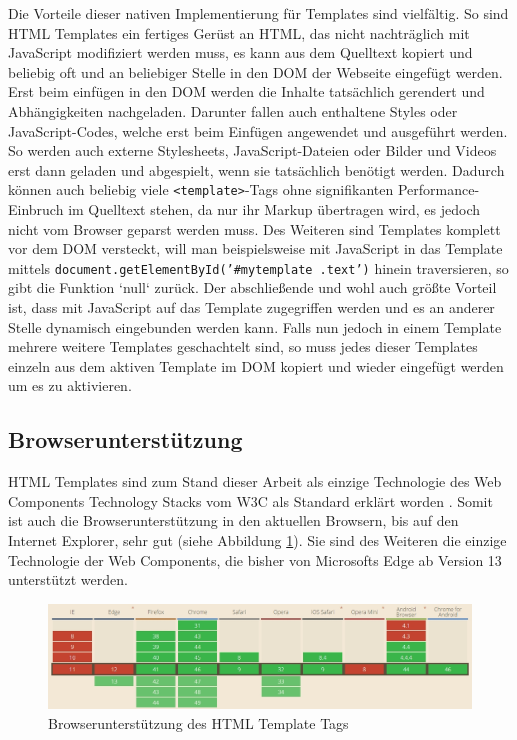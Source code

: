Die Vorteile dieser nativen Implementierung für Templates sind vielfältig. So sind \ac{HTML} Templates ein fertiges Gerüst an \ac{HTML}, das nicht nachträglich mit JavaScript modifiziert werden muss, es kann aus dem Quelltext kopiert und beliebig oft und an beliebiger Stelle in den \ac{DOM} der Webseite eingefügt werden. Erst beim einfügen in den \ac{DOM} werden die Inhalte tatsächlich gerendert und Abhängigkeiten nachgeladen. Darunter fallen auch enthaltene Styles oder JavaScript-Codes, welche erst beim Einfügen angewendet und ausgeführt werden. So werden auch externe Stylesheets, JavaScript-Dateien oder Bilder und Videos erst dann geladen und abgespielt, wenn sie tatsächlich benötigt werden. Dadurch können auch beliebig viele \texttt{\textless{}template\textgreater{}}-Tags ohne signifikanten Performance-Einbruch im Quelltext stehen, da nur ihr Markup übertragen wird, es jedoch nicht vom Browser geparst werden muss. Des Weiteren sind Templates komplett vor dem \ac{DOM} versteckt, will man beispielsweise mit JavaScript in das Template mittels \texttt{document.getElementById('\#mytemplate\ .text')} hinein traversieren, so gibt die Funktion `null` zurück. Der abschließende und wohl auch größte Vorteil ist, dass mit JavaScript auf das Template zugegriffen werden und es an anderer Stelle dynamisch eingebunden werden kann.
Falls nun jedoch in einem Template mehrere weitere Templates geschachtelt sind, so muss jedes dieser Templates einzeln aus dem aktiven Template im \ac{DOM} kopiert und wieder eingefügt werden um es zu aktivieren.


\subsection{Browserunterstützung}\label{html-templates-browserunterstuetzung}

\ac{HTML} Templates sind zum Stand dieser Arbeit als einzige Technologie des Web Components Technology Stacks vom \ac{W3C} als Standard erklärt worden \cite{citeulike:13853159}. Somit ist auch die Browserunterstützung in den aktuellen Browsern, bis auf den Internet Explorer, sehr gut (siehe Abbildung \ref{fig:bdhtmltt}). Sie sind des Weiteren die einzige Technologie der Web Components, die bisher von Microsofts Edge ab Version 13 unterstützt werden.

\begin{figure}[htbp]
 \centering
 \includegraphics[width=\linewidth]{kapitel2/bilder/4-html-templates-browserunterstuetzung}
 \caption{Browserunterstützung des HTML Template Tags}
 \label{fig:bdhtmltt}
\end{figure}
